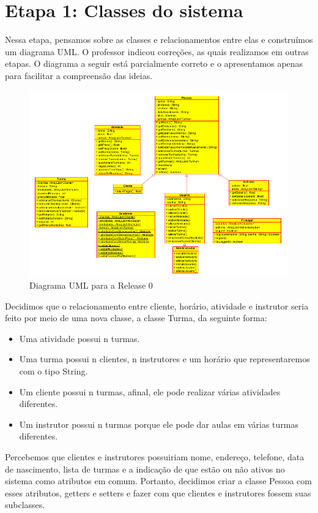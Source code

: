 \documentclass[11pt,twoside]{article}
\begin{document}
\section{Etapa 1: Classes do sistema}
Nessa etapa, pensamos sobre as classes e relacionamentos entre elas e construímos um diagrama UML. O professor indicou correções,
as quais realizamos em outras etapas. O diagrama a seguir está parcialmente correto e o apresentamos apenas para facilitar a
compreensão das ideias.

\begin{figure}[H]
\centering
\includegraphics[width=.75\textwidth]{uml0}
\caption{Diagrama UML para a Release 0}
\end{figure}

Decidimos que o relacionamento entre cliente, horário, atividade e instrutor seria feito por meio de uma nova classe, a classe
Turma, da seguinte forma:

\begin{itemize}
  \item Uma atividade possui n turmas.
  \item Uma turma possui n clientes, n instrutores e um horário que representaremos com o tipo String.
  \item Um cliente possui n turmas, afinal, ele pode realizar várias atividades diferentes.
  \item Um instrutor possui n turmas porque ele pode dar aulas em várias turmas diferentes.
\end{itemize}

Percebemos que clientes e instrutores possuiriam nome, endereço, telefone, data de nascimento, lista de turmas e a indicação
de que estão ou não ativos no sistema como atributos em comum. Portanto, decidimos criar a classe Pessoa com esses atributos, getters e
setters
e fazer com que clientes
e instrutores fossem suas subclasses.
\end{document}
